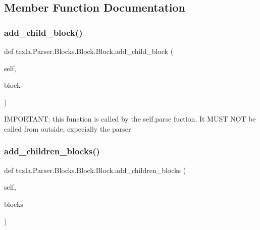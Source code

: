 \subsection{Member Function Documentation}
\hypertarget{classtexla_1_1Parser_1_1Blocks_1_1Block_1_1Block_aba033196247b84b24bed702573350019}{}\label{classtexla_1_1Parser_1_1Blocks_1_1Block_1_1Block_aba033196247b84b24bed702573350019} 
\subsubsection{\texorpdfstring{add\+\_\+child\+\_\+block()}{add\_child\_block()}}
{\footnotesize\ttfamily def texla.\+Parser.\+Blocks.\+Block.\+Block.\+add\+\_\+child\+\_\+block (\begin{DoxyParamCaption}\item[{}]{self,  }\item[{}]{block }\end{DoxyParamCaption})}

\begin{DoxyVerb}IMPORTANT: this function is called by the self.parse fuction.
It MUST NOT be called from outside, expecially the parser
\end{DoxyVerb}
 \hypertarget{classtexla_1_1Parser_1_1Blocks_1_1Block_1_1Block_a1529f89c563d66a4cde7cdbcc8e758de}{}\label{classtexla_1_1Parser_1_1Blocks_1_1Block_1_1Block_a1529f89c563d66a4cde7cdbcc8e758de} 
\subsubsection{\texorpdfstring{add\+\_\+children\+\_\+blocks()}{add\_children\_blocks()}}
{\footnotesize\ttfamily def texla.\+Parser.\+Blocks.\+Block.\+Block.\+add\+\_\+children\+\_\+blocks (\begin{DoxyParamCaption}\item[{}]{self,  }\item[{}]{blocks }\end{DoxyParamCaption})}

